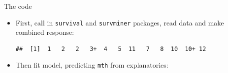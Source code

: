 \begin{frame}[fragile]{The code}

  \begin{itemize}
  \item First, call in \texttt{survival} and \texttt{survminer}
    packages, read data and make combined response:
 
\begin{knitrout}
\color{fgcolor}\begin{kframe}
\begin{alltt}
\end{alltt}


{\ttfamily\noindent\itshape\color{messagecolor}{\#\# Loading required package: ggplot2}}\begin{alltt}
\hlkwb{=}\hlstd{(}\hlstd{,}
\hlkwb{=}
\end{alltt}
\begin{verbatim}
##  [1]  1   2   2   3+  4   5  11   7   8  10  10+ 12
\end{verbatim}
\end{kframe}
\end{knitrout}

    
  \item Then fit model, predicting \texttt{mth} from explanatories:

 
\begin{knitrout}
\color{fgcolor}\begin{kframe}
\begin{alltt}
\hlkwb{=}\hlopt{~}\hlopt{+}
\end{alltt}
\end{kframe}
\end{knitrout}


  \end{itemize}

\end{frame}

